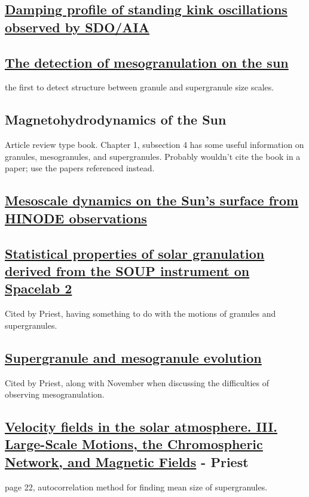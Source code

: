 \documentclass{article}
\begin{document}
\subsection{%
\href{http://adsabs.harvard.edu/abs/2016A\%26A...585L...6P}
{Damping profile of standing kink oscillations observed by SDO/AIA}
}

\subsection{%
\href{http://adsabs.harvard.edu/abs/1981ApJ...245L.123N}
{The detection of mesogranulation on the sun}}
the first to detect structure between granule
and supergranule size scales.

\subsection{%
Magnetohydrodynamics of the Sun}
Article review type book. Chapter 1, subsection 4 has some useful
information on granules, mesogranules, and supergranules.
Probably wouldn't cite the book in a paper; use the papers referenced
instead.

\subsection{%
\href{http://adsabs.harvard.edu/cgi-bin/bib_query?arXiv:0902.2299}
{Mesoscale dynamics on the Sun's surface from HINODE
observations}}

\subsection{%
\href{http://cdsads.u-strasbg.fr/abs/1989ApJ...336..475T}
{Statistical properties of solar granulation derived
from the SOUP instrument on Spacelab 2}}
Cited by Priest, having something to do with the motions of granules and supergranules.

\subsection{%
\href{http://cdsads.u-strasbg.fr/abs/2000SoPh..193..313S}
{Supergranule and mesogranule evolution}}
Cited by Priest, along with November when
discussing the difficulties of observing mesogranulation.

\subsection{%
\href{http://cdsads.u-strasbg.fr/abs/1964ApJ...140.1120S}
{Velocity fields in the solar atmosphere. III.
Large-Scale Motions, the Chromospheric Network, and Magnetic Fields}
- Priest}
page 22, autocorrelation method for finding mean size of supergranules.
\end{document}
